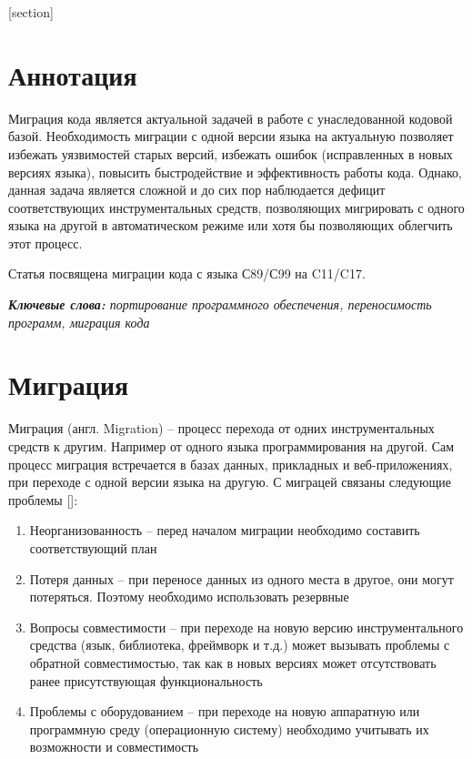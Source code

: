 \documentclass{article}
\begin{document}
	\setcounter{tocdepth}{2}

	

	\newpage

	\begin{center}
	\tableofcontents
	\end{center}


	\newpage

	[section]


	\section{Аннотация}

	Миграция кода является актуальной задачей в работе с унаследованной кодовой базой. Необходимость миграции с одной версии языка на актуальную позволяет избежать уязвимостей старых версий, избежать ошибок (исправленных в новых версиях языка), повысить быстродействие и эффективность работы кода. Однако, данная задача является сложной и до сих пор наблюдается дефицит соответствующих инструментальных средств, позволяющих мигрировать с одного языка на другой в автоматическом режиме или хотя бы позволяющих облегчить этот процесс.
	
	Статья посвящена миграции кода с языка С89/С99 на C11/C17.

	\textit{\textbf{Ключевые слова:} портирование программного обеспечения, переносимость программ, миграция кода}

	\section{Миграция}

	Миграция (англ. Migration) -- процесс перехода от одних инструментальных средств к другим. Например от одного языка программирования на другой. Сам процесс миграция встречается в базах данных, прикладных и веб-приложениях, при переходе с одной версии языка на другую. С миграцей связаны следующие проблемы [\theexample]:

	\begin{enumerate}
		\item{Неорганизованность -- перед началом миграции необходимо составить соответствующий план}
		\item{Потеря данных -- при переносе данных из одного места в другое, они могут потеряться. Поэтому необходимо использовать резервные}
		\item{Вопросы совместимости -- при переходе на новую версию инструментального средства (язык, библиотека, фреймворк и т.д.) может вызывать проблемы с обратной совместимостью, так как в новых версиях может отсутствовать ранее присутствующая функциональность }
		\item{Проблемы с оборудованием -- при переходе на новую аппаратную или программную среду (операционную систему) необходимо учитывать их возможности и совместимость}
	\end{enumerate}
\end{document}
